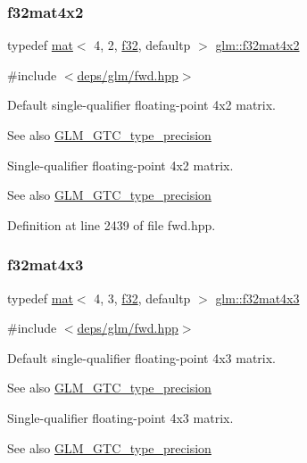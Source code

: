 \subsubsection{\texorpdfstring{f32mat4x2}{f32mat4x2}}
{\footnotesize\ttfamily typedef \hyperlink{structglm_1_1mat}{mat}$<$ 4, 2, \hyperlink{group__gtc__type__precision_ga0ec999b57f5330d9021256e96038df04}{f32}, defaultp $>$ \hyperlink{group__gtc__type__precision_gab0498cc84bb77002f41630e3cd0be87b}{glm\+::f32mat4x2}}



{\ttfamily \#include $<$\hyperlink{fwd_8hpp}{deps/glm/fwd.\+hpp}$>$}

Default single-\/qualifier floating-\/point 4x2 matrix. \begin{DoxySeeAlso}{See also}
\hyperlink{group__gtc__type__precision}{G\+L\+M\+\_\+\+G\+T\+C\+\_\+type\+\_\+precision}
\end{DoxySeeAlso}
Single-\/qualifier floating-\/point 4x2 matrix. \begin{DoxySeeAlso}{See also}
\hyperlink{group__gtc__type__precision}{G\+L\+M\+\_\+\+G\+T\+C\+\_\+type\+\_\+precision} 
\end{DoxySeeAlso}


Definition at line 2439 of file fwd.\+hpp.

\mbox{\label{group__gtc__type__precision_ga74544c9bd76adba0e7767b6b2a574d0f}} 
\subsubsection{\texorpdfstring{f32mat4x3}{f32mat4x3}}
{\footnotesize\ttfamily typedef \hyperlink{structglm_1_1mat}{mat}$<$ 4, 3, \hyperlink{group__gtc__type__precision_ga0ec999b57f5330d9021256e96038df04}{f32}, defaultp $>$ \hyperlink{group__gtc__type__precision_ga74544c9bd76adba0e7767b6b2a574d0f}{glm\+::f32mat4x3}}



{\ttfamily \#include $<$\hyperlink{fwd_8hpp}{deps/glm/fwd.\+hpp}$>$}

Default single-\/qualifier floating-\/point 4x3 matrix. \begin{DoxySeeAlso}{See also}
\hyperlink{group__gtc__type__precision}{G\+L\+M\+\_\+\+G\+T\+C\+\_\+type\+\_\+precision}
\end{DoxySeeAlso}
Single-\/qualifier floating-\/point 4x3 matrix. \begin{DoxySeeAlso}{See also}
\hyperlink{group__gtc__type__precision}{G\+L\+M\+\_\+\+G\+T\+C\+\_\+type\+\_\+precision} 
\end{DoxySeeAlso}


